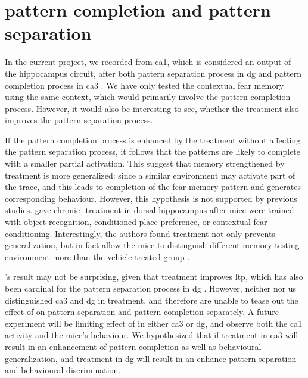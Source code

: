 \section{pattern completion and pattern separation}

In the current project, we recorded from \gls{ca1}, which is considered an output of the hippocampus circuit, after both pattern separation process in \gls{dg} and pattern completion process in \gls{ca3} \citep{rolls13}. We have only tested the contextual fear memory using the same context, which would primarily involve the pattern completion process. However, it would also be interesting to see, whether the \tglu{} treatment also improves the pattern-separation process. 

If the pattern completion process is enhanced by the \tglu{} treatment without affecting the pattern separation process, it follows that the patterns are likely to complete with a smaller partial activation. This suggest that memory strengthened by \tglu{} treatment is more generalized: since a similar environment may activate part of the trace, and this leads to completion of the fear memory pattern and generates corresponding behaviour. However, this hypothesis is not supported by previous studies. \citet{migues16} gave chronic \tglu{}-treatment in dorsal hippocampus after mice were trained with object recognition, conditioned place preference, or contextual fear conditioning. Interestingly, the authors found \tglu{} treatment not only prevents generalization, but in fact allow the mice to distinguish different memory testing environment more than the vehicle treated group \citep{migues16}. 

\citet{migues16}'s result may not be surprising, given that \tglu{} treatment improves \gls{ltp}, which has also been cardinal for the pattern separation process in \gls{dg} \citep{rolls13}. However, neither \citet{migues16} nor us distinguished \gls{ca3} and \gls{dg} in \tglu{} treatment, and therefore are unable to tease out the effect of \tglu{} on pattern separation and pattern completion separately. A future experiment will be limiting effect of \tglu{} in either \gls{ca3} or \gls{dg}, and observe both the \gls{ca1} activity and the mice's behaviour. We hypothesized that if \tglu{} treatment in \gls{ca3} will result in an enhancement of pattern completion as well as behavioural generalization, and treatment in \gls{dg} will result in an enhance pattern separation and behavioural discrimination. 

